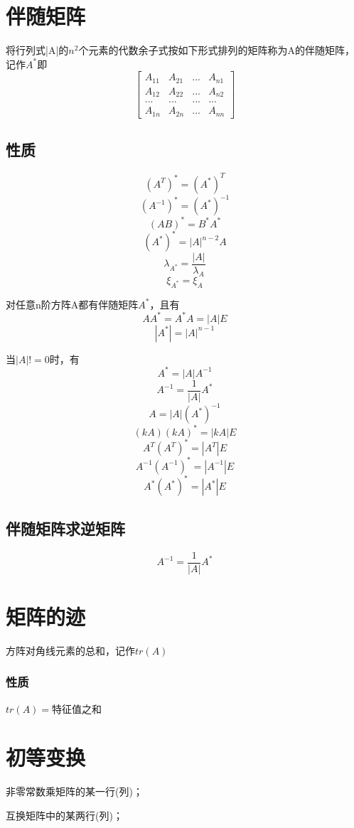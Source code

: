 \section{伴随矩阵}

将行列式|A|的\(n^2\)个元素的代数余子式按如下形式排列的矩阵称为A的伴随矩阵，记作\(A^*\)即
\[\begin{bmatrix}
A_{11} & A_{21} & ... & A_{n1} \\ 
A_{12} & A_{22} & ... & A_{n2} \\ 
... & ... & ... & ... \\ 
A_{1n} & A_{2n} & ... & A_{nn}
\end{bmatrix}\]


\subsection{性质}

\[(A^T)^* = (A^*)^T\]
\[(A^{-1})^* = (A^*)^{-1}\]
\[(AB)^* = B^*A^*\]
\[(A^*)^* = |A|^{n - 2}A\]
\[\lambda_{A^*} = \dfrac{|A|}{\lambda_A}\]
\[\xi_{A^*} = \xi_A\]

对任意n阶方阵A都有伴随矩阵\(A^*\)，且有
\[AA^* = A^*A = |A|E\]
\[|A^*| = |A|^{n-1}\]

当\(|A|!= 0\)时，有
\[A^* = |A|A^{-1}\]
\[A^{-1} = \frac{1}{|A|}A^*\]
\[A = |A|(A^*)^{-1}\]
\[(kA)(kA)^* = |kA|E\]
\[A^T(A^T)^* = |A^T|E\]
\[A^{-1}(A^{-1})^* = |A^{-1}|E\]
\[A^*(A^*)^* = |A^*|E\]


\subsection{伴随矩阵求逆矩阵}
\[A^{-1} = \frac{1}{|A|}A^*\]


\section{矩阵的迹}
方阵对角线元素的总和，记作\(tr(A)\)

\subsubsection{性质}

\(tr(A) = \)特征值之和


\section{初等变换}

非零常数乘矩阵的某一行(列)；

互换矩阵中的某两行(列)；

